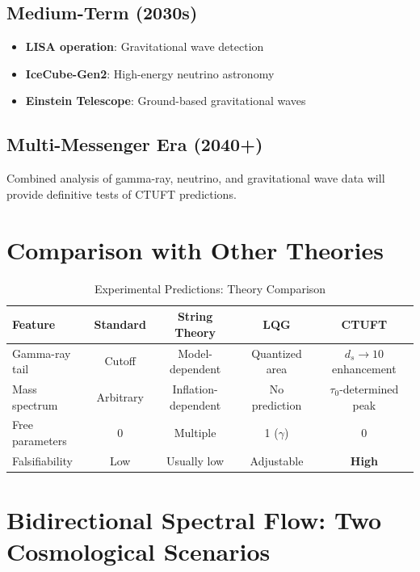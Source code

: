 \subsection{Medium-Term (2030s)}
\label{subsec:medium-term}

\begin{itemize}
    \item \textbf{LISA operation}: Gravitational wave detection
    \item \textbf{IceCube-Gen2}: High-energy neutrino astronomy
    \item \textbf{Einstein Telescope}: Ground-based gravitational waves
\end{itemize}

\subsection{Multi-Messenger Era (2040+)}
\label{subsec:multi-messenger}

Combined analysis of gamma-ray, neutrino, and gravitational wave data will provide definitive tests of CTUFT predictions.

\section{Comparison with Other Theories}
\label{sec:comparison-theories}

\begin{table}[htbp]
\centering
\caption{Experimental Predictions: Theory Comparison}
\label{tab:theory-comparison}
\begin{tabular}{@{}lcccc@{}}
\toprule
\textbf{Feature} & \textbf{Standard} & \textbf{String Theory} & \textbf{LQG} & \textbf{CTUFT} \\
\midrule
Gamma-ray tail & Cutoff & Model-dependent & Quantized area & $d_s \to 10$ enhancement \\
Mass spectrum & Arbitrary & Inflation-dependent & No prediction & $\tau_0$-determined peak \\
Free parameters & 0 & Multiple & 1 ($\gamma$) & 0 \\
Falsifiability & Low & Usually low & Adjustable & \textbf{High} \\
\bottomrule
\end{tabular}
\end{table}

\section{Bidirectional Spectral Flow: Two Cosmological Scenarios}
\label{sec:two-scenarios}

